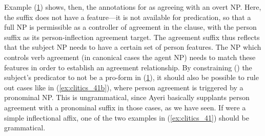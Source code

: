 Example (\ref{ex:clitics_44}) shows, then, the annotations for
 as agreeing with an overt NP. Here, the suffix does
not have a \Pred{} feature---it is not available for predication, so that a
full NP is permissible as a controller of agreement in the clause, with the
person suffix as its person-inflection agreement target. The agreement suffix
 thus reflects that the subject NP needs to have a certain set of
person features. The NP which controls verb agreement (in canonical cases the
agent NP) needs to match these features in order to establish an agreement
relationship. By constraining (\req{}) the subject's predicator to not be a
pro-form in (\ref{ex:clitics_44}), it should also be possible to rule out cases
like in (\ref{ex:clitics_41b}), where person agreement is triggered by a
pronominal NP. This is ungrammatical, since Ayeri basically supplants person
agreement with a pronominal suffix in those cases, as we have seen. If
 were a simple inflectional affix, one of the two examples 
in (\ref{ex:clitics_41}) should be grammatical.

\begin{figure}[h]
\begin{morphlex}
\ex\label{ex:clitics_44}
\xe
\end{morphlex}
\end{figure}

